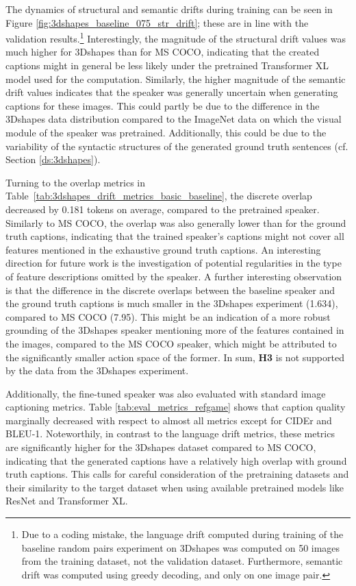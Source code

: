 The dynamics of structural and semantic drifts during training can be seen in Figure \ref{fig:3dshapes_baseline_075_str_drift}; these are in line with the validation results.\footnote{Due to a coding mistake, the language drift computed during training of the baseline random pairs experiment on 3Dshapes was computed on 50 images from the training dataset, not the validation dataset. Furthermore, semantic drift was computed using greedy decoding, and only on one image pair.} 
Interestingly, the magnitude of the structural drift values was much higher for 3Dshapes than for MS COCO, indicating that the created captions might in general be less likely under the pretrained Transformer XL model used for the computation. Similarly, the higher magnitude of the semantic drift values indicates that the speaker was generally uncertain when generating captions for these images. This could partly be due to the difference in the 3Dshapes data distribution compared to the ImageNet data on which the visual module of the speaker was pretrained. Additionally, this could be due to the variability of the syntactic structures of the generated ground truth sentences (cf. Section \ref{ds:3dshapes}). 

Turning to the overlap metrics in Table~\ref{tab:3dshapes_drift_metrics_basic_baseline}, the discrete overlap decreased by 0.181 tokens on average, compared to the pretrained speaker. Similarly to MS COCO, the overlap was also generally lower than for the ground truth captions, indicating that the trained speaker's captions might not cover all features mentioned in the exhaustive ground truth captions. An interesting direction for future work is the investigation of potential regularities in the type of feature descriptions omitted by the speaker. A further interesting observation is that the difference in the discrete overlaps between the baseline speaker and the ground truth captions is much smaller in the 3Dshapes experiment (1.634), compared to MS COCO (7.95). This might be an indication of a more robust grounding of the 3Dshapes speaker mentioning more of the features contained in the images, compared to the MS COCO speaker, which might be attributed to the significantly smaller action space of the former. In sum, \textbf{H3} is not supported by the data from the 3Dshapes experiment.


Additionally, the fine-tuned speaker was also evaluated with standard image captioning metrics. Table \ref{tab:eval_metrics_refgame} shows that caption quality marginally decreased with respect to almost all metrics except for CIDEr and BLEU-1. Noteworthily, in contrast to the language drift metrics, these metrics are significantly higher for the 3Dshapes dataset compared to MS COCO, indicating that the generated captions have a relatively high overlap with ground truth captions. This calls for careful consideration of the pretraining datasets and their similarity to the target dataset when using available pretrained models like ResNet and Transformer XL.

